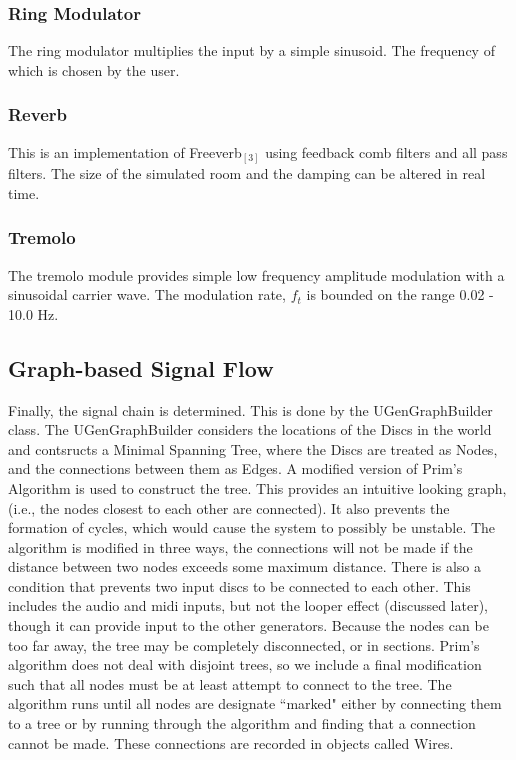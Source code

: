 \documentclass[pdftext,twoside,10pt]{article}
\begin{document}
\subsubsection*{Ring Modulator}
The ring modulator multiplies the input by a simple sinusoid. The frequency of which is chosen by the user.

\subsubsection*{Reverb}
This is an implementation of Freeverb$_{[3]}$ using feedback comb filters and all pass filters. The size of the simulated room and the damping can be altered in real time.

\subsubsection*{Tremolo} 
The tremolo module provides simple low frequency amplitude modulation with a sinusoidal carrier wave. The modulation rate, $f_t$ is bounded on the range 0.02 - 10.0 Hz.


\subsection{Graph-based Signal Flow}
Finally, the signal chain is determined. This is done by the UGenGraphBuilder class. The UGenGraphBuilder considers the locations of the Discs in the world and contsructs a Minimal Spanning Tree, where the Discs are treated as Nodes, and the connections between them as Edges. A modified version of Prim's Algorithm is used to construct the tree. This provides an intuitive looking graph, (i.e., the nodes closest to each other are connected). It also prevents the formation of cycles, which would cause the system to possibly be unstable. The algorithm is modified in three ways, the connections will not be made if the distance between two nodes exceeds some maximum distance. There is also a condition that prevents two input discs to be connected to each other. This includes the audio and midi inputs, but not the looper effect (discussed later), though it can provide input to the other generators. Because the nodes can be too far away, the tree may be completely disconnected, or in sections. Prim's algorithm does not deal with disjoint trees, so we include a final modification such that all nodes must be at least attempt to connect to the tree. The algorithm runs until all nodes are designate ``marked" either by connecting them to a tree or by running through the algorithm and finding that a connection cannot be made. These connections are recorded in objects called Wires.
\end{document}
